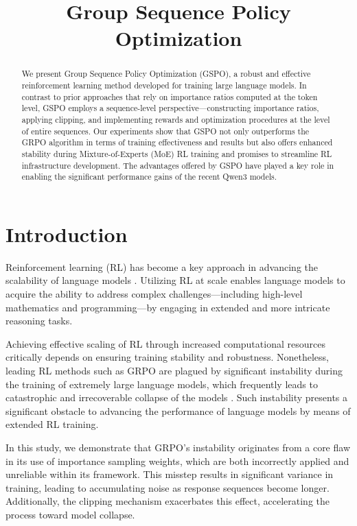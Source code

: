 \title{Group Sequence Policy Optimization}

\begin{abstract}
We present Group Sequence Policy Optimization (GSPO), a robust and effective reinforcement learning method developed for training large language models. In contrast to prior approaches that rely on importance ratios computed at the token level, GSPO employs a sequence-level perspective—constructing importance ratios, applying clipping, and implementing rewards and optimization procedures at the level of entire sequences. Our experiments show that GSPO not only outperforms the GRPO algorithm in terms of training effectiveness and results but also offers enhanced stability during Mixture-of-Experts (MoE) RL training and promises to streamline RL infrastructure development. The advantages offered by GSPO have played a key role in enabling the significant performance gains of the recent Qwen3 models.
\end{abstract}

\section{Introduction}
\label{sec:intro}

Reinforcement learning (RL) has become a key approach in advancing the scalability of language models \citep{o1,dpsk-r1,qwq32b,qwen3}. Utilizing RL at scale enables language models to acquire the ability to address complex challenges—including high-level mathematics and programming—by engaging in extended and more intricate reasoning tasks.

Achieving effective scaling of RL through increased computational resources critically depends on ensuring training stability and robustness. Nonetheless, leading RL methods such as GRPO \citep{grpo} are plagued by significant instability during the training of extremely large language models, which frequently leads to catastrophic and irrecoverable collapse of the models \citep{qwen3, minimax-m1}. Such instability presents a significant obstacle to advancing the performance of language models by means of extended RL training.

In this study, we demonstrate that GRPO's instability originates from a core flaw in its use of importance sampling weights, which are both incorrectly applied and unreliable within its framework. This misstep results in significant variance in training, leading to accumulating noise as response sequences become longer. Additionally, the clipping mechanism exacerbates this effect, accelerating the process toward model collapse.


